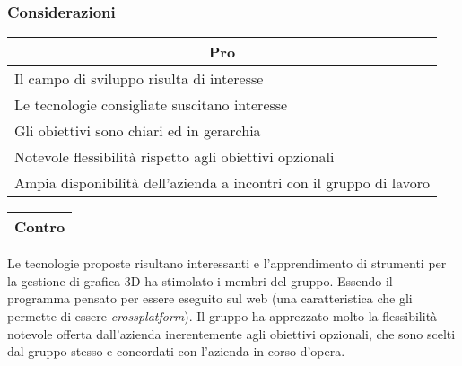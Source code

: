 \subsubsection{Considerazioni}
\begin{minipage}[t]{0.45\linewidth}
    \vspace{0pt}
    {\renewcommand{\arraystretch}{1.5}
    \begin{tabular}{p{1\linewidth}}
        \multicolumn{1}{c}{\textbf{Pro}} \\
        \midrule
		Il campo di sviluppo risulta di interesse \\
		Le tecnologie consigliate suscitano interesse \\
		Gli obiettivi sono chiari ed in gerarchia \\
		Notevole flessibilità rispetto agli obiettivi opzionali \\
		Ampia disponibilità dell'azienda a incontri con il gruppo di lavoro \\
        \hline
    \end{tabular}
    }
\end{minipage}
\hspace{0.05\linewidth}
\begin{minipage}[t]{0.45\linewidth}
    \vspace{0pt}
    {\renewcommand{\arraystretch}{1.5}
    \begin{tabular}{p{1\linewidth}}
        \multicolumn{1}{c}{\textbf{Contro}} \\
        \midrule
        \hline
    \end{tabular}
    }
\end{minipage}
\vspace{1em}

Le tecnologie proposte risultano interessanti e l'apprendimento di strumenti per 
la gestione di grafica 3D ha stimolato i membri del gruppo.
Essendo il programma pensato per essere eseguito sul web (una caratteristica che 
gli permette di essere \textit{crossplatform}). Il gruppo ha apprezzato molto la
flessibilità notevole offerta dall'azienda inerentemente agli obiettivi
opzionali, che sono scelti dal gruppo stesso e concordati con l'azienda in corso
d'opera.
